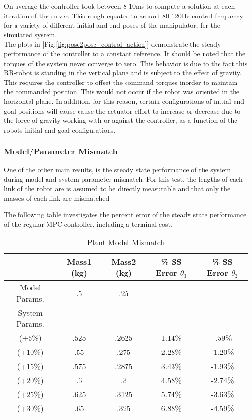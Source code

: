 \documentclass[journal]{IEEEtran}
\begin{document}
On average the controller took between 8-10ms to compute a solution at each iteration of the solver. This rough equates to around 80-120Hz control frequency for a variety of different initial and end poses of the manipulator, for the simulated system. \\

The plots in [Fig.\ref{fig:pose2pose_control_action}] demonstrate the steady performance of the controller to a constant reference. It should be noted that the torques of the system never converge to zero. This behavior is due to the fact this RR-robot is standing in the vertical plane and is subject to the effect of gravity. This requires the controller to offset the command torques inorder to maintain the commanded position. This would not occur if the robot was oriented in the horizontal plane. In addition, for this reason, certain configurations of initial and goal positions will cause cause the actuator effort to increase or decrease due to the force of gravity working with or against the controller, as a function of the robots initial and goal configurations. \\

\subsubsection{Model/Parameter Mismatch}

One of the other main results, is the steady state performance of the system during model and system parameter mismatch. For this test, the lengths of each link of the robot are is assumed to be directly measurable and that only the masses of each link are mismatched.

The following table investigates the percent error of the steady state performance of the regular MPC controller, including a terminal cost.

\begin{table}[ht]\caption{Plant Model Mismatch}
    \centering
    \begin{tabular}{c c c c c}
          & Mass1 (kg) & Mass2 (kg) & \% SS Error $\theta_1$ & \% SS Error $\theta_2$  \\
        \hline\hline

        Model Params. & .5 & .25 & &  \\
        \hline
        System Params. &  & & &  \\
        \hline
        (+5\%)  & .525 & .2625 & 1.14\% & -.59\%   \\
        (+10\%) & .55 & .275 & 2.28\% & -1.20\% \\
        (+15\%) & .575 & .2875 & 3.43\% & -1.93\% \\
        (+20\%) & .6 & .3 & 4.58\% & -2.74\% \\
        (+25\%) & .625 & .3125 & 5.74\% & -3.63\% \\
        (+30\%) & .65 & .325 & 6.88\% & -4.59\% \\ [1ex]

    \end{tabular}
    \label{table:mismatch}
\end{table}
\end{document}

